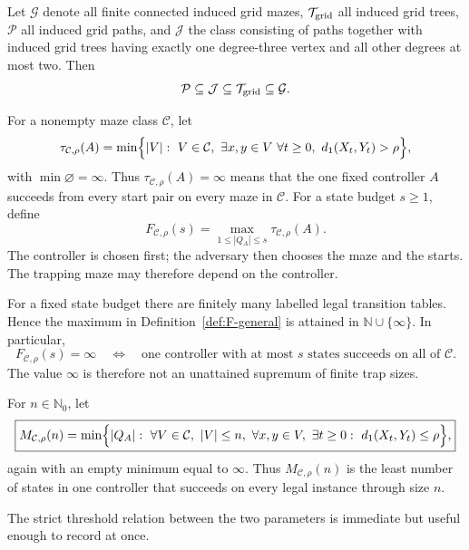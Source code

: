 Let $\mathcal G$ denote all finite connected induced grid mazes, $\mathcal T_{\rm grid}$ all induced grid trees, $\mathcal P$ all induced grid paths, and $\mathcal J$ the class consisting of paths together with induced grid trees having exactly one degree-three vertex and all other degrees at most two.  Then
\[
 \mathcal P\subseteq\mathcal J\subseteq\mathcal T_{\rm grid}\subseteq\mathcal G.
\]

\begin{definition}\label{def:F-general}
For a nonempty maze class $\mathcal C$, let
\[
 \tau_{\mathcal C,\rho}(A)
 =\min\Bigl\{|V|:\ V\in\mathcal C,\ \exists x,y\in V\ 
       \forall t\ge0,\ d_1(X_t,Y_t)>\rho\Bigr\},
\]
with $\min\varnothing=\infty$.  Thus $\tau_{\mathcal C,\rho}(A)=\infty$ means that the one fixed controller $A$ succeeds from every start pair on every maze in $\mathcal C$.  For a state budget $s\ge1$, define
\[
 \boxed{F_{\mathcal C,\rho}(s)
 =\max_{1\le |Q_A|\le s}\tau_{\mathcal C,\rho}(A).}
\]
The controller is chosen first; the adversary then chooses the maze and the starts.  The trapping maze may therefore depend on the controller.
\end{definition}

For a fixed state budget there are finitely many labelled legal transition tables.  Hence the maximum in Definition~\ref{def:F-general} is attained in $\mathbb N\cup\{\infty\}$.  In particular,
\begin{equation}\label{eq:F-infinity-meaning}
 F_{\mathcal C,\rho}(s)=\infty
 \quad\Longleftrightarrow\quad
 \text{one controller with at most $s$ states succeeds on all of $\mathcal C$.}
\end{equation}
The value $\infty$ is therefore not an unattained supremum of finite trap sizes.

\begin{definition}\label{def:M-general}
For $n\in\mathbb N_0$, let
\[
 \boxed{M_{\mathcal C,\rho}(n)
 =\min\Bigl\{|Q_A|:\ \forall V\in\mathcal C,\ |V|\le n,\ 
       \forall x,y\in V,\ \exists t\ge0:\ d_1(X_t,Y_t)\le\rho\Bigr\},}
\]
again with an empty minimum equal to $\infty$.  Thus $M_{\mathcal C,\rho}(n)$ is the least number of states in one controller that succeeds on every legal instance through size $n$.
\end{definition}

The strict threshold relation between the two parameters is immediate but useful enough to record at once.


